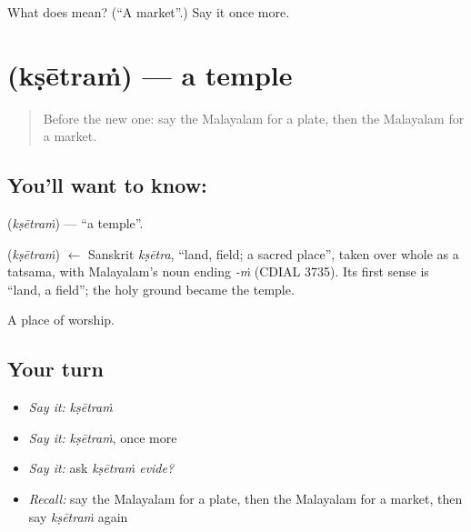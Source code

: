 \begin{tcolorbox}[breakable,colback=teal!4,colframe=teal!35!black,title={Before you move on}]
What does  mean? (\textquotedblleft{}A market\textquotedblright{}.) Say it once more.
\end{tcolorbox}
\section[\texorpdfstring{\ml{ക്ഷേത്രം} (kṣētraṁ)}{ക്ഷേത്രം (kṣētraṁ)}]{ (kṣētraṁ) — a temple}

\label{lesson:ML-C135-temple}



\begin{quote}
Before the new one: say the Malayalam for a plate, then the Malayalam for a market.
\end{quote}

\subsection*{You'll want to know: }
\textbf{} (\emph{kṣētraṁ}) — \textquotedblleft{}a temple\textquotedblright{}.

\begin{cousinweb}
\textbf{} (\emph{kṣētraṁ}) $\leftarrow$ Sanskrit \emph{kṣētra}, \textquotedblleft{}land, field; a sacred place\textquotedblright{}, taken over whole as a tatsama, with Malayalam's noun ending \emph{-ṁ} (CDIAL 3735). Its first sense is \textquotedblleft{}land, a field\textquotedblright{}; the holy ground became the temple.
\end{cousinweb}

\begin{grammarlens}[title={What you've built}]
A place of worship.
\end{grammarlens}

\subsection*{Your turn}
\begin{itemize}
\raggedright
  \item \emph{Say it:} \emph{kṣētraṁ}
  \item \emph{Say it:} \emph{kṣētraṁ}, once more
  \item \emph{Say it:} ask \emph{kṣētraṁ evide?}
  \item \emph{Recall:} say the Malayalam for a plate, then the Malayalam for a market, then say \emph{kṣētraṁ} again
\end{itemize}

